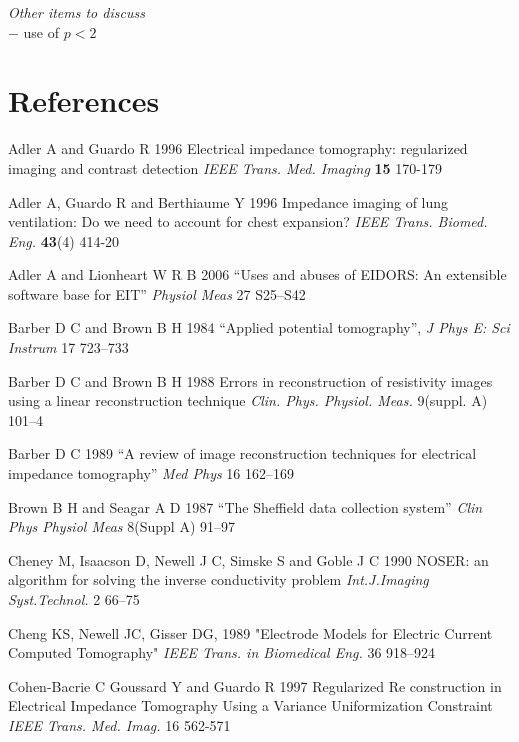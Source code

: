 \documentclass[12pt]{iopart}
\begin{document}
{\em Other items to discuss}
\\
$-$ use of $p<2$



\section*{References}

\References %
\item[]
Adler A and Guardo R 1996 Electrical impedance tomography:
regularized imaging and contrast detection {\em IEEE Trans. Med.
Imaging} {\bf 15} 170-179

\item[]
Adler A, Guardo R and Berthiaume Y 1996 Impedance imaging of lung
ventilation: Do we need to account for chest expansion? {\em IEEE
Trans. Biomed. Eng.} {\bf 43}(4) 414-20


\item[]
Adler A and Lionheart W R B 2006
``Uses and abuses of EIDORS: An extensible software base for EIT''
{\em Physiol Meas}
27 S25--S42

\item[]
Barber D C and Brown B H 1984
``Applied potential tomography'', 
{\em J Phys E: Sci Instrum}
 17 723--733

\item[]
Barber D C and Brown B H 1988 Errors in reconstruction of
resistivity images using a linear reconstruction technique {\em
Clin. Phys. Physiol. Meas.} 
9(suppl. A) 101--4

\item[]
Barber D C 1989
``A review of image reconstruction techniques for electrical
 impedance tomography''
{\em Med Phys}
16 162--169

\item[]
Brown B H and Seagar A D 1987 
``The Sheffield data collection system''
{\em Clin Phys Physiol Meas}
 8(Suppl A) 91--97

\item[]
Cheney M, Isaacson D, Newell J C, Simske S and Goble J C 1990
NOSER: an algorithm for solving the inverse conductivity problem
{\em Int.J.Imaging Syst.Technol.} 
2 66--75

\item[]
Cheng KS, Newell JC, Gisser DG, 1989
"Electrode Models for Electric Current Computed Tomography"
{\em IEEE Trans. in Biomedical Eng.}
36 918--924


\item[]
Cohen-Bacrie C  Goussard Y and Guardo R
1997
Regularized Re construction in Electrical
Impedance Tomography Using a Variance
Uniformization Constraint 
{\em IEEE Trans. Med. Imag.} 16 562-571
\end{document}
